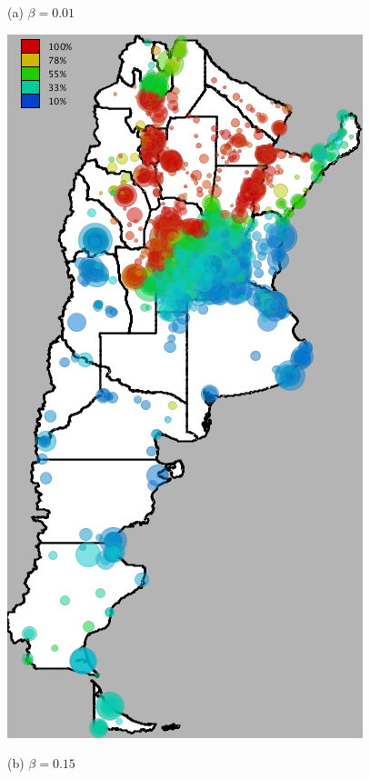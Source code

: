 \begin{figure}[ht]
\begin{minipage}{.495\linewidth}
		(a) $\beta = 0.01$
	\end{minipage}
	\begin{minipage}{.495\linewidth}
		\centering
		\includegraphics[width=0.90\linewidth]
		{figures/201112_hi_res_argentina_usuarios_proporcion_circulos_beta15/201112_hi_res_argentina_usuarios_proporcion_circulos_beta15}

		(b) $\beta = 0.15$
	\end{minipage}
\end{figure}


